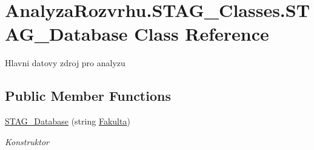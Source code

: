 \hypertarget{class_analyza_rozvrhu_1_1_s_t_a_g___classes_1_1_s_t_a_g___database}{}\section{Analyza\+Rozvrhu.\+S\+T\+A\+G\+\_\+\+Classes.\+S\+T\+A\+G\+\_\+\+Database Class Reference}
\label{class_analyza_rozvrhu_1_1_s_t_a_g___classes_1_1_s_t_a_g___database}


Hlavni datovy zdroj pro analyzu  


\subsection*{Public Member Functions}
\begin{DoxyCompactItemize}
\item 
\hyperlink{class_analyza_rozvrhu_1_1_s_t_a_g___classes_1_1_s_t_a_g___database_a72bb593ee581a9ffa547441e30ad4fb5}{S\+T\+A\+G\+\_\+\+Database} (string \hyperlink{namespace_analyza_rozvrhu_1_1_s_t_a_g___classes_a2e3181499083134e3da66098b571fb83}{Fakulta})
\begin{DoxyCompactList}\small\item\em Konstruktor \end{DoxyCompactList}\end{DoxyCompactItemize}
